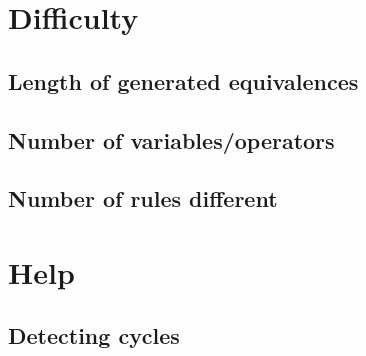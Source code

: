 \documentclass{report}
\begin{document}
\section{Difficulty}
\subsection{Length of generated equivalences}
\subsection{Number of variables/operators}
\subsection{Number of rules different}

\section{Help}
\subsection{Detecting cycles}
\label{sub:detecting_cycles}
\end{document}
